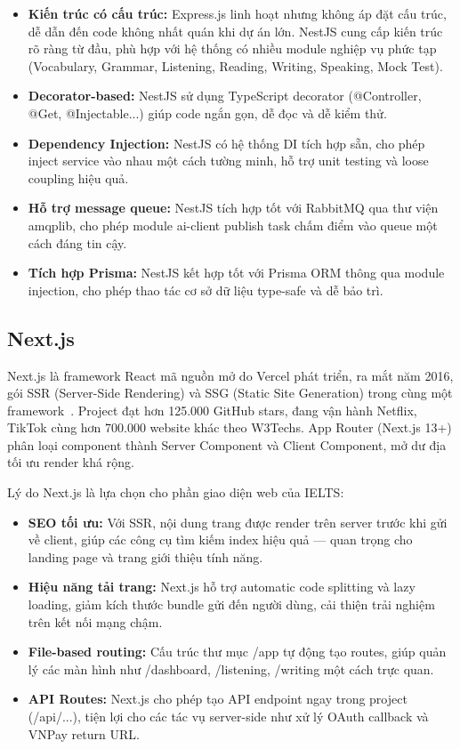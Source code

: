 \begin{itemize}
    \item \textbf{Kiến trúc có cấu trúc:} Express.js linh hoạt nhưng không áp đặt cấu trúc, dễ dẫn đến code không nhất quán khi dự án lớn. NestJS cung cấp kiến trúc rõ ràng từ đầu, phù hợp với hệ thống có nhiều module nghiệp vụ phức tạp (Vocabulary, Grammar, Listening, Reading, Writing, Speaking, Mock Test).
    \item \textbf{Decorator-based:} NestJS sử dụng TypeScript decorator (@Controller, @Get, @Injectable...) giúp code ngắn gọn, dễ đọc và dễ kiểm thử.
    \item \textbf{Dependency Injection:} NestJS có hệ thống DI tích hợp sẵn, cho phép inject service vào nhau một cách tường minh, hỗ trợ unit testing và loose coupling hiệu quả.
    \item \textbf{Hỗ trợ message queue:} NestJS tích hợp tốt với RabbitMQ qua thư viện amqplib, cho phép module ai-client publish task chấm điểm vào queue một cách đáng tin cậy.
    \item \textbf{Tích hợp Prisma:} NestJS kết hợp tốt với Prisma ORM thông qua module injection, cho phép thao tác cơ sở dữ liệu type-safe và dễ bảo trì.
\end{itemize}

\subsection{Next.js}

Next.js là framework React mã nguồn mở do Vercel phát triển, ra mắt năm 2016, gói SSR (Server-Side Rendering) và SSG (Static Site Generation) trong cùng một framework~\cite{nextjs-docs}. Project đạt hơn 125.000 GitHub stars, đang vận hành Netflix, TikTok cùng hơn 700.000 website khác theo W3Techs. App Router (Next.js 13+) phân loại component thành Server Component và Client Component, mở dư địa tối ưu render khá rộng.

Lý do Next.js là lựa chọn cho phần giao diện web của IELTS:

\begin{itemize}
    \item \textbf{SEO tối ưu:} Với SSR, nội dung trang được render trên server trước khi gửi về client, giúp các công cụ tìm kiếm index hiệu quả --- quan trọng cho landing page và trang giới thiệu tính năng.
    \item \textbf{Hiệu năng tải trang:} Next.js hỗ trợ automatic code splitting và lazy loading, giảm kích thước bundle gửi đến người dùng, cải thiện trải nghiệm trên kết nối mạng chậm.
    \item \textbf{File-based routing:} Cấu trúc thư mục /app tự động tạo routes, giúp quản lý các màn hình như /dashboard, /listening, /writing một cách trực quan.
    \item \textbf{API Routes:} Next.js cho phép tạo API endpoint ngay trong project (/api/...), tiện lợi cho các tác vụ server-side như xử lý OAuth callback và VNPay return URL.
\end{itemize}

